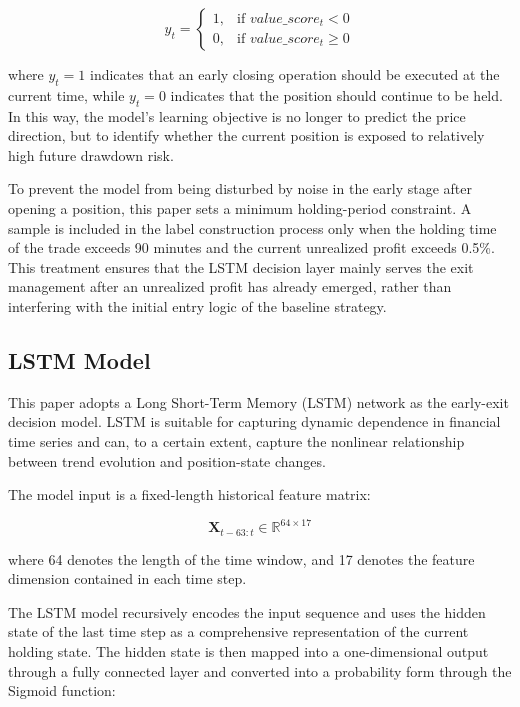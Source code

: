 \documentclass[12pt]{article}
\begin{document}
\begin{equation}
    y_t =
    \begin{cases}
    1, & \text{if } value\_score_t < 0 \\
    0, & \text{if } value\_score_t \geq 0
    \end{cases}
\end{equation}

where $y_t = 1$ indicates that an early closing operation should be executed at the current 
time, while $y_t = 0$ indicates that the position should continue to be held. In this way, the 
model's learning objective is no longer to predict the price direction, but to identify whether 
the current position is exposed to relatively high future drawdown risk.

To prevent the model from being disturbed by noise in the early stage after opening a position, 
this paper sets a minimum holding-period constraint. A sample is included in the label 
construction process only when the holding time of the trade exceeds 90 minutes and the current 
unrealized profit exceeds 0.5\%. This treatment ensures that the LSTM decision layer mainly 
serves the exit management after an unrealized profit has already emerged, rather than 
interfering with the initial entry logic of the baseline strategy.

\subsection{LSTM Model}

This paper adopts a Long Short-Term Memory (LSTM) network as the early-exit decision model. 
LSTM is suitable for capturing dynamic dependence in financial time series and can, to a 
certain extent, capture the nonlinear relationship between trend evolution and position-state 
changes.

The model input is a fixed-length historical feature matrix:

\begin{equation}
    \mathbf{X}_{t-63:t} \in \mathbb{R}^{64 \times 17}
\end{equation}

where 64 denotes the length of the time window, and 17 denotes the feature dimension contained 
in each time step.

The LSTM model recursively encodes the input sequence and uses the hidden state of the last 
time step as a comprehensive representation of the current holding state. The hidden state is 
then mapped into a one-dimensional output through a fully connected layer and converted into a 
probability form through the Sigmoid function:
\end{document}
